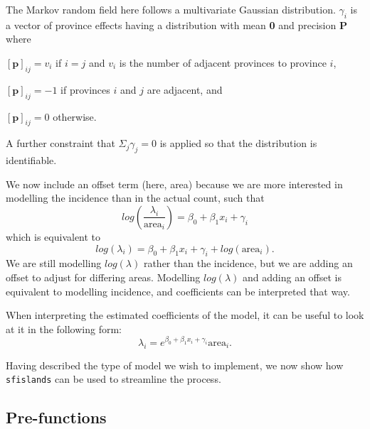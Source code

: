 The Markov random field here follows a multivariate Gaussian
distribution. \(\gamma_i\) is a vector of province effects having a
distribution with mean \textbf{0} and precision \textbf{P} where

\([\textbf{p}]_{ij} = v_i\) if \(i=j\) and \(v_i\) is the number of adjacent provinces
to province \(i\),

\([\textbf{p}]_{ij} = -1\) if provinces \(i\) and \(j\) are adjacent, and

\([\textbf{p}]_{ij} = 0\) otherwise.

A further constraint that \(\Sigma_j \gamma_j = 0\) is applied so that the
distribution is identifiable.

We now include an offset term (here, area) because we are more interested
in modelling the incidence than in the actual count, such that
\begin{equation}
log(\frac{\lambda_i} {\text{area}_i}) = \beta_0 + \beta_1x_i + \gamma_i
\label{eq:eq6}
\end{equation}
which is equivalent to
\begin{equation}
log(\lambda_i) = \beta_0 + \beta_1x_i + \gamma_i + log(\text{area}_i).
\label{eq:eq7}
\end{equation}
We are still modelling \(log(\lambda)\) rather than the incidence, but we
are adding an offset to adjust for differing areas. Modelling \(log(\lambda)\) and adding an offset is equivalent to
modelling incidence, and coefficients can be interpreted that way.

When interpreting the estimated coefficients of the model, it can be
useful to look at it in the following form:
\begin{equation}
\lambda_i = e^{\beta_0 + \beta_1 x_i + \gamma_i} \text{area}_i.
\label{eq:eq8}
\end{equation}

Having described the type of model we wish to implement, we now show how \texttt{sfislands} can be used to streamline the process.

\hypertarget{pre-functions-1}{%
\subsection{Pre-functions}\label{pre-functions-1}}

